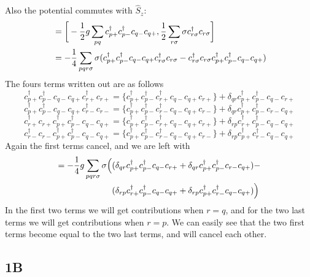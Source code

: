 \documentclass[norsk,a4paper,12pt]{article}
\begin{document}
Also the potential commutes with $\hat{S}_z$:
\begin{align}
[\hat{V},\hat{S}_z]&=\bigg[-\frac{1}{2}g\sum_{pq}c_{p+}^{\dagger}c_{p-}^{\dagger}c_{q-}c_{q+},\frac{1}{2}\sum_{r\sigma}\sigma c_{r\sigma}^{\dagger}c_{r\sigma}\bigg]\notag\\
&=-\frac{1}{4}\sum_{pqr\sigma}\sigma(c_{p+}^{\dagger}c_{p-}^{\dagger}c_{q-}c_{q+}c_{r\sigma}^{\dagger}c_{r\sigma}-c_{r\sigma}^{\dagger}c_{r\sigma}c_{p+}^{\dagger}c_{p-}^{\dagger}c_{q-}c_{q+})
\end{align}
The fours terms written out are as follows
\begin{equation}
c_{p+}^{\dagger}c_{p-}^{\dagger}c_{q-}c_{q+}c_{r+}^{\dagger}c_{r+}=\{c_{p+}^{\dagger}c_{p-}^{\dagger}c_{r+}^{\dagger}c_{q-}c_{q+}c_{r+}\}+\delta_{qr}c_{p+}^{\dagger}c_{p-}^{\dagger}c_{q-}c_{r+}
\end{equation}
\begin{equation}
c_{p+}^{\dagger}c_{p-}^{\dagger}c_{q-}c_{q+}c_{r-}^{\dagger}c_{r-}=\{c_{p+}^{\dagger}c_{p-}^{\dagger}c_{r-}^{\dagger}c_{q-}c_{q+}c_{r-}\}+\delta_{qr}c_{p+}^{\dagger}c_{p-}^{\dagger}c_{r-}c_{q+}
\end{equation}
\begin{equation}
c_{r+}^{\dagger}c_{r+}c_{p+}^{\dagger}c_{p-}^{\dagger}c_{q-}c_{q+}=\{c_{p+}^{\dagger}c_{p-}^{\dagger}c_{r+}^{\dagger}c_{q-}c_{q+}c_{r+}\}+\delta_{rp}c_{r+}^{\dagger}c_{p-}^{\dagger}c_{q-}c_{q+}
\end{equation}
\begin{equation}
c_{r-}^{\dagger}c_{r-}c_{p+}^{\dagger}c_{p-}^{\dagger}c_{q-}c_{q+}=\{c_{p+}^{\dagger}c_{p-}^{\dagger}c_{r-}^{\dagger}c_{q-}c_{q+}c_{r-}\}+\delta_{rp}c_{p+}^{\dagger}c_{r-}^{\dagger}c_{q-}c_{q+}
\end{equation}
Again the first terms cancel, and we are left with
\begin{align}
[\hat{V},\hat{S}_z]=-\frac{1}{4}g\sum_{pqr\sigma}\sigma\Big(&(\delta_{qr}c_{p+}^{\dagger}c_{p-}^{\dagger}c_{q-}c_{r+}+\delta_{qr}c_{p+}^{\dagger}c_{p-}^{\dagger}c_{r-}c_{q+})-\notag\\
&(\delta_{rp}c_{r+}^{\dagger}c_{p-}^{\dagger}c_{q-}c_{q+}+\delta_{rp}c_{p+}^{\dagger}c_{r-}^{\dagger}c_{q-}c_{q+})\Big)
\end{align}
In the first two terms we will get contributions when $r=q$, and for the two last terms we will get contributions when $r=p$. We can easily see that the two first terms become equal to the two last terms, and will cancel each other.

\subsection*{1B}
\end{document}
